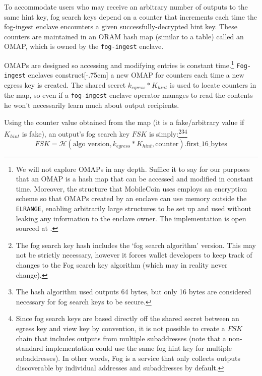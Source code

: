 To accommodate users who may receive an arbitrary number of outputs to the same hint key, fog search keys depend on a counter that increments each time the fog-ingest enclave encounters a given successfully-decrypted hint key. These counters are maintained in an ORAM hash map (similar to a table) called an OMAP, which is owned by the {\tt fog-ingest} enclave.

OMAPs are designed so accessing and modifying entries is constant time.\footnote{We will not explore OMAPs in any depth. Suffice it to say for our purposes that an OMAP is a hash map that can be accessed and modified in constant time. Moreover, the structure that MobileCoin uses employs an encryption scheme so that OMAPs created by an enclave can use memory outside the {\tt ELRANGE}, enabling arbitrarily large structures to be set up and used without leaking any information to the enclave owner. The implementation is open sourced at \cite{mobilecoin-omap-source-code}.} {\tt Fog-ingest} enclaves construct[-.75cm] a new OMAP for counters each time a new egress key is created. The shared secret $k_{egress}*K_{hint}$ is used to locate counters in the map, so even if a {\tt fog-ingest} enclave operator manages to read the contents he won't necessarily learn much about output recipients.

Using the counter value obtained from the map (it is a fake/arbitrary value if $K_{hint}$ is fake), an output's fog search key $FSK$ is simply:\footnote{The fog search key hash includes the `fog search algorithm' version. This may not be strictly necessary, however it forces wallet developers to keep track of changes to the Fog search key algorithm (which may in reality never change).}\footnote{The hash algorithm used outputs 64 bytes, but only 16 bytes are considered necessary for fog search keys to be secure.}\footnote{Since fog search keys are based directly off the shared secret between an egress key and view key by convention, it is not possible to create a $FSK$ chain that includes outputs from multiple subaddresses (note that a non-standard implementation could use the same fog hint key for multiple subaddresses). In other words, Fog is a service that only collects outputs discoverable by individual addresses and subaddresses by default.}\vspace{.155cm}
\[FSK = \mathcal{H}(\textrm{algo version}, k_{egress}*K_{hint}, \textrm{counter})\textrm{.first\_16\_bytes}\]

